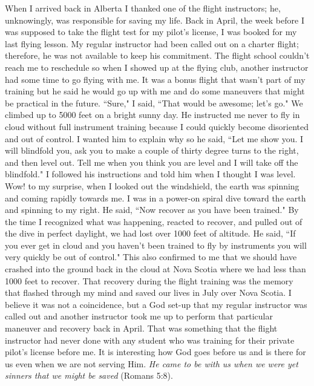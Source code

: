 \documentclass[oneside]{book}
\begin{document}
When I arrived back in Alberta I thanked one of the flight instructors; he, unknowingly, was responsible for saving my life. Back in April, the week before I was supposed to take the flight test for my pilot's license, I was booked for my last flying lesson. My regular instructor had been called out on a charter flight; therefore, he was not available to keep his commitment. The flight school couldn't reach me to reschedule so when I showed up at the flying club, another instructor had some time to go flying with me. It was a bonus flight that wasn't part of my training but he said he would go up with me and do some maneuvers that might be practical in the future. ``Sure," I said, ``That would be awesome; let's go." We climbed up to 5000 feet on a bright sunny day. He instructed me never to fly in cloud without full instrument training because I could quickly become disoriented and out of control. I wanted him to explain why so he said, ``Let me show you. I will blindfold you, ask you to make a couple of thirty degree turns to the right, and then level out. Tell me when you think you are level and I will take off the blindfold." I followed his instructions and told him when I thought I was level. Wow! to my surprise, when I looked out the windshield, the earth was spinning and coming rapidly towards me. I was in a power-on spiral dive toward the earth and spinning to my right. He said, ``Now recover as you have been trained." By the time I recognized what was happening, reacted to recover, and pulled out of the dive in perfect daylight, we had lost over 1000 feet of altitude. He said, ``If you ever get in cloud and you haven't been trained to fly by instruments you will very quickly be out of control." This also confirmed to me that we should have crashed into the ground back in the cloud at Nova Scotia where we had less than 1000 feet to recover. That recovery during the flight training was the memory that flashed through my mind and saved our lives in July over Nova Scotia. I believe it was not a coincidence, but a God set-up that my regular instructor was called out and another instructor took me up to perform that particular maneuver and recovery back in April. That was something that the flight instructor had never done with any student who was training for their private pilot's license before me. It is interesting how God goes before us and is there for us even when we are not serving Him. \textit{He came to be with us when we were yet sinners that we might be saved} (Romans 5:8). 
\end{document}
